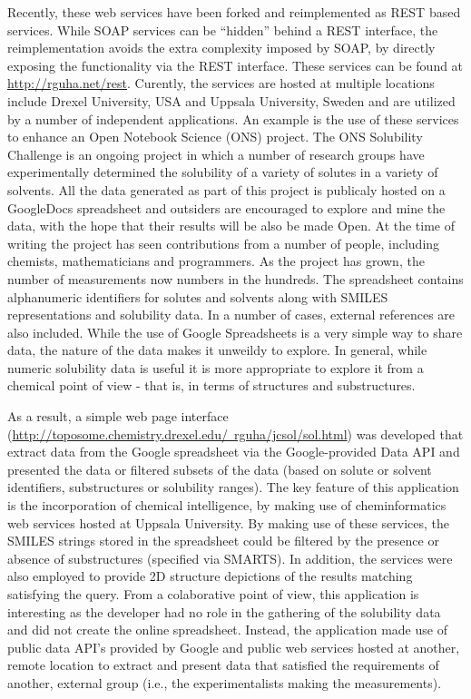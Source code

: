 \documentclass[12pt]{book}
\begin{document}
Recently, these web services have been forked and reimplemented as
REST based services. While SOAP services can be ``hidden'' behind a
REST interface, the reimplementation avoids the extra complexity
imposed by SOAP, by directly exposing the functionality via the REST
interface. These services can be found at
\href{http://rguha.net/rest}{http://rguha.net/rest}. Curently, the
services are hosted at multiple locations include Drexel University,
USA and Uppsala University, Sweden and are utilized by a number of
independent applications. An example is the use of these services to
enhance an Open Notebook Science (ONS) project. The ONS Solubility
Challenge is an ongoing project in which a number of research groups
have experimentally determined the solubility of a variety of solutes
in a variety of solvents. All the data generated as part of this
project is publicaly hosted on a GoogleDocs spreadsheet and outsiders
are encouraged to explore and mine the data, with the hope that their
results will be also be made Open. At the time of writing the project
has seen contributions from a number of people, including chemists,
mathematicians and programmers. As the project has grown, the number
of measurements now numbers in the hundreds. The spreadsheet contains
alphanumeric identifiers for solutes and solvents along with SMILES
representations and solubility data. In a number of cases, external
references are also included. While the use of Google Spreadsheets is
a very simple way to share data, the nature of the data makes it
unweildy to explore. In general, while numeric solubility data is
useful it is more appropriate to explore it from a chemical point of
view - that is, in terms of structures and substructures.

As a result, a simple web page interface
(\href{http://toposome.chemistry.drexel.edu/~rguha/jcsol/sol.html}{http://toposome.chemistry.drexel.edu/~rguha/jcsol/sol.html})
was developed that extract data from the Google spreadsheet via the
Google-provided Data API and presented the data or filtered subsets of
the data (based on solute or solvent identifiers, substructures or
solubility ranges). The key feature of this application is the
incorporation of chemical intelligence, by making use of
cheminformatics web services hosted at Uppsala University. By making
use of these services, the SMILES strings stored in the spreadsheet
could be filtered by the presence or absence of substructures
(specified via SMARTS). In addition, the services were also employed
to provide 2D structure depictions of the results matching satisfying
the query. From a colaborative point of view, this application is
interesting as the developer had no role in the gathering of the
solubility data and did not create the online spreadsheet. Instead,
the application made use of public data API's provided by Google and
public web services hosted at another, remote location to extract and
present data that satisfied the requirements of another, external
group (i.e., the experimentalists making the measurements).
\end{document}
